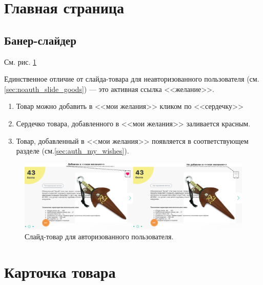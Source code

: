         
    \section{Главная страница}
        \subsection{Банер-слайдер}
        
            См. рис. \ref{fig:auth_slide_goods}

            Единственное отличие от слайда-товара для неавторизованного 
            пользователя (см. \ref{sec:noauth_slide_goods})
            --- это активная ссылка <<желание>>.
            
            \begin{enumerate}
                \item Товар можно добавить в <<мои желания>> кликом по 
                <<сердечку>>
                \item Сердечко товара, добавленного в <<мои желания>> 
                заливается красным.
                \item Товар, добавленный в <<мои желания>> появляется в 
                соответствующем разделе (см.\ref{sec:auth_my_wishes}).
            \end{enumerate}
            
            \begin{figure}
                \center
                \includegraphics[width=170mm]{04_auth_funcs/figures/04.eps}
                \caption{Слайд-товар для авторизованного пользователя.}
                \label{fig:auth_slide_goods}
            \end{figure}
        
        
     \section{Карточка товара}


